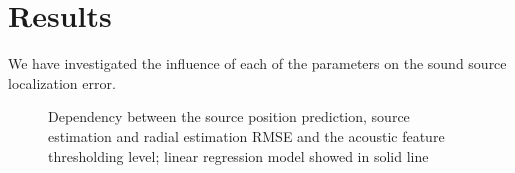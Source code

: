 \documentclass[applsci,article,submit,moreauthors,pdftex]{Definitions/mdpi}
\begin{document}
\section{Results}

We have investigated the influence of each of the parameters on the sound source localization error.

\begin{figure}[h!]
	\centering
	\caption{Dependency between the source position prediction, source \doa{} estimation  and radial estimation RMSE and the 
		acoustic feature thresholding level; 
		linear regression model showed in solid line}
	\label{fig:rmsethrmeanlvl}
\end{figure}
\end{document}
